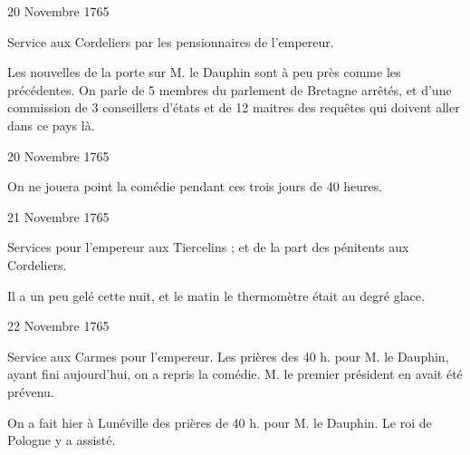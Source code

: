                      \begin{diary}{20 Novembre 1765}{}

                         Service aux Cordeliers par les pensionnaires
                           de l'empereur. \bigskip


                         Les nouvelles de la porte sur
                              M. le Dauphin
                           sont à peu près comme les précédentes.
                           On parle de 5 membres du parlement
                              de
                              Bretagne
                           arrêtés, et d'une commission de
                           3 conseillers d'états et de 12 maitres des
                           requêtes qui doivent aller dans ce pays là. \bigskip


                     \end{diary}


                     \begin{diary}{20 Novembre 1765}{}

                         On ne jouera point la comédie
                           pendant ces trois jours de 40 heures. \bigskip


                     \end{diary}

                     \begin{diary}{21 Novembre 1765}{}

                         Services pour l'empereur aux Tiercelins ; et de
                           la part des pénitents
                           aux Cordeliers. \bigskip


                         Il a un peu gelé cette nuit, et le
                           matin
                           le thermomètre était au degré glace. \bigskip


                     \end{diary}

                     \begin{diary}{22 Novembre 1765}{}

                         Service aux Carmes pour l'empereur.
                           Les prières des 40 h. pour M. le
                              Dauphin, ayant fini aujourd'hui, on a
                           repris la comédie. M. le premier président en
                           avait été prévenu. \bigskip


                         On a fait hier à Lunéville des prières
                           de 40 h. pour M. le
                              Dauphin. Le roi
                              de Pologne y a assisté. \bigskip


                     \end{diary}

